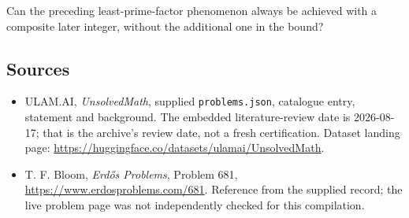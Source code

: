\documentclass[11pt,a4paper]{article}
\begin{document}
Can the preceding least-prime-factor phenomenon always be achieved with a composite later integer, without the additional one in the bound?

\subsection{Sources}

{\small

\begin{itemize}

\item[\hypertarget{source:statement:1}{S1}] ULAM.AI, \emph{UnsolvedMath}, supplied \texttt{problems.json}, catalogue entry, statement and background. The embedded literature-review date is 2026-08-17; that is the archive’s review date, not a fresh certification. Dataset landing page: \url{https://huggingface.co/datasets/ulamai/UnsolvedMath}.

\item[\hypertarget{source:statement:2}{S2}] T. F. Bloom, \emph{Erdős Problems}, Problem 681, \url{https://www.erdosproblems.com/681}. Reference from the supplied record; the live problem page was not independently checked for this compilation.

\end{itemize}

}

\label{end:statement}
\end{document}
